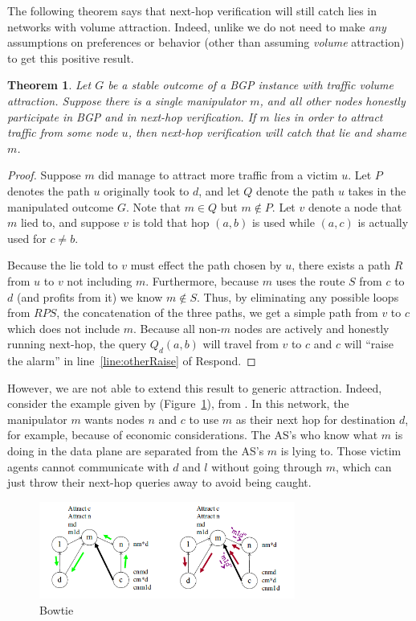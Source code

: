 \documentclass[10pt]{article}
\newtheorem{theorem}{Theorem}
\begin{document}
  The following theorem says that next-hop verification will still catch lies
  in networks with volume attraction.
  Indeed, unlike \cite{Attraction} we do not need to make \emph{any} assumptions
  on preferences or behavior (other than assuming \emph{volume} attraction)
  to get this positive result.
  \begin{theorem}
    Let $G$ be a stable outcome of a BGP instance with traffic volume attraction.
    Suppose there is a single manipulator $m$,
    and all other nodes honestly participate in BGP and in next-hop verification.
    If $m$ lies in order to attract traffic from some node $u$,
    then next-hop verification will catch that lie and shame $m$.
  \end{theorem}
  \begin{proof}
    Suppose $m$ did manage to attract more traffic from a victim $u$.
    Let $P$ denotes the path $u$ originally took to $d$,
    and let $Q$ denote the path $u$ takes in the manipulated outcome $G$.
    Note that $m\in Q$ but $m\notin P$.
    Let $v$ denote a node that $m$ lied to, and suppose $v$ is told
    that hop $(a,b)$ is used while $(a,c)$ is actually used for $c\ne b$.

    Because the lie told to $v$ must effect the path chosen by $u$,
    there exists a path $R$ from $u$ to $v$ not including $m$.
    Furthermore, because $m$ uses the route $S$ from $c$ to $d$
    (and profits from it) we know $m\notin S$.
    Thus, by eliminating any possible loops from $RPS$,
    the concatenation of the three paths,
    we get a simple path from $v$ to $c$ which does not include $m$.
    Because all non-$m$ nodes are actively and honestly running next-hop,
    the query $Q_d(a,b)$ will travel from $v$ to $c$ and $c$ will
    ``raise the alarm'' in line~\ref{line:otherRaise} of {\sc
    Respond}.
  \end{proof}

  However, we are not able to extend this result to generic attraction.
  Indeed, consider the example given by (Figure~\ref{fig:Bowtie}),
  from \cite{Attraction}.
  In this network, the manipulator $m$ wants nodes $n$ and $c$
  to use $m$ as their next hop for destination $d$,
  for example, because of economic considerations.
  The AS's who know what $m$ is doing in the data plane
  are separated from the AS's $m$ is lying to.
  Those victim agents cannot communicate with $d$ and $l$ without
  going through $m$, which can just throw their next-hop queries away
  to avoid being caught.
  \begin{figure}[h]
    \centering
    \caption{Bowtie}\label{fig:Bowtie}
    \includegraphics[width=0.75\textwidth]{Bowtie}
  \end{figure}
\end{document}
